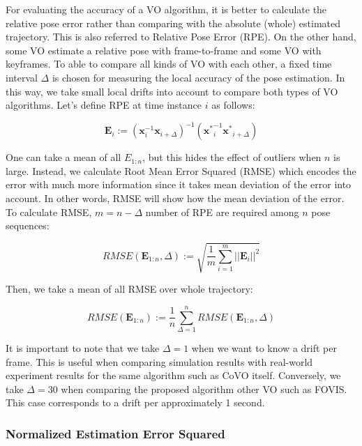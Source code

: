 \documentclass[a4paper]{report}
\numberwithin{figure}{section}
\begin{document}
For evaluating the accuracy of a VO algorithm, it is better to calculate the relative pose error rather than comparing with the absolute (whole) estimated trajectory. This is also referred to Relative Pose Error (RPE).  On the other hand, some VO estimate a relative pose with frame-to-frame and some VO with keyframes.  To able to compare all kinds of VO with each other, a fixed time interval $\Delta$ is chosen for measuring the local accuracy of the pose estimation.  In this way, we take small local drifts into account to compare both types of VO algorithms.  Let's define RPE at time instance $i$ as follows:

\begin{equation}
  \mathbf{E}_i := 
  (\mathbf{x}_i^{-1} \mathbf{x}_{i+\Delta})^{-1} 
  (\mathbf{x^*}_i^{-1}\mathbf{x^*}_{i+\Delta})
\end{equation}

One can take a mean of all $E_{1:n}$, but this hides the effect of outliers when $n$ is large.  Instead, we calculate Root Mean Error Squared (RMSE) which encodes the error with much more information since it takes mean deviation of the error into account.
In other words, RMSE will show how the mean deviation of the error.  To calculate RMSE, $m = n - \Delta$ number of RPE are required among $n$ pose sequences:

\begin{equation}
  RMSE(\mathbf{E}_{1:n},\Delta) := \sqrt{\frac{1}{m} \sum_{i=1}^{m}||\mathbf{E}_i||^2}
\end{equation}

Then, we take a mean of all RMSE over whole trajectory:

\begin{equation}
  RMSE(\mathbf{E}_{1:n}) :=  \frac{1}{n} \sum_{\Delta=1}^{n}RMSE(\mathbf{E}_{1:n},\Delta)
\end{equation}

It is important to note that we take $\Delta=1$ when we want to know 
a drift per frame. This is useful when comparing simulation results with 
real-world experiment results for the same algorithm such as CoVO itself. 
Conversely, we take $\Delta=30$ when comparing 
the proposed algorithm other VO such as FOVIS. This case corresponds to a drift per approximately 
1 second.

\subsubsection{Normalized Estimation Error Squared}
\end{document}
